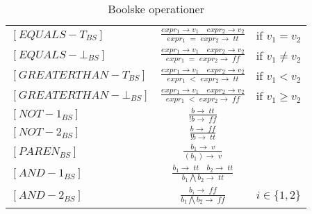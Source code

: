 \bgroup
\def\arraystretch{3}
\begin{table}[H]
\centering
\begin{tabular}{l c l}
    
    $[EQUALS-T_{BS}]$ &$\frac{expr_1 \rightarrow v_1 \quad expr_2 \rightarrow v_2}{expr_1\;=\;expr_2 \rightarrow \; tt}$ & if $v_1 = v_2$ \\
    
    $[EQUALS-\bot_{BS}]$ &$\frac{expr_1 \rightarrow v_1 \quad expr_2 \rightarrow v_2}{expr_1\;=\;expr_2 \rightarrow \; ff}$ & if $v_1 \ne v_2$ \\
    
    $[GREATERTHAN-T_{BS}]$ &$\frac{expr_1 \rightarrow v_1 \quad expr_2 \rightarrow v_2}{expr_1\;<\;expr_2 \rightarrow \; tt}$ & if $v_1 < v_2$ \\
    
    $[GREATERTHAN-\bot_{BS}]$ &$\frac{expr_1 \rightarrow v_1 \quad expr_2 \rightarrow v_2}{expr_1\;<\;expr_2 \rightarrow \; ff}$ & if $v_1 \geq v_2$ \\ %
    
    $[NOT-1_{BS}]$ &$\frac{b \rightarrow \; tt}{! b \rightarrow \; ff}$ & \\
    
    $[NOT-2_{BS}]$ &$\frac{b \rightarrow \; ff}{! b \rightarrow \; tt}$ & \\
    
    $[PAREN_{BS}]$ &$\frac{b_1 \rightarrow \; v}{(b_1) \rightarrow \; v}$ & \\
    
    $[AND-1_{BS}]$ &$\frac{b_1 \rightarrow \; tt \quad b_2 \rightarrow \; tt}{b_1 \bigwedge b_2 \rightarrow \; tt}$ & \\
    
    $[AND-2_{BS}]$ &$\frac{b_i \rightarrow \; ff}{b_1 \bigwedge b_2 \rightarrow \; ff}$ & $i \in \{1, 2\}$\\
    
    
\end{tabular}
\caption{Boolske operationer}
\label{tab:bool}
\end{table}
\egroup